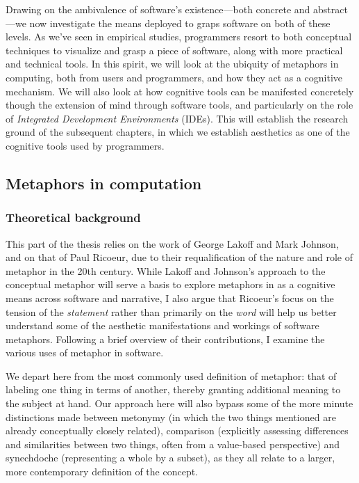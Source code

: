 Drawing on the ambivalence of software's existence—both concrete and abstract—we now investigate the means deployed to graps software on both of these levels. As we've seen in empirical studies, programmers resort to both conceptual techniques to visualize and grasp a piece of software, along with more practical and technical tools. In this spirit, we will look at the ubiquity of metaphors in computing,  both from users and programmers, and how they act as a cognitive mechanism. We will also look at how cognitive tools can be manifested concretely though the extension of mind through software tools, and particularly on the role of \emph{Integrated Development Environments} (IDEs). This will establish the research ground of the subsequent chapters, in which we establish aesthetics as one of the cognitive tools used by programmers.

\vspace{1\baselineskip}

\subsection{Metaphors in computation}

\subsubsection{Theoretical background}

This part of the thesis relies on the work of George Lakoff and Mark Johnson, and on that of Paul Ricoeur, due to their requalification of the nature and role of metaphor in the 20th century. While Lakoff and Johnson's approach to the conceptual metaphor will serve a basis to explore metaphors in as a cognitive means across software and narrative, I also argue that Ricoeur's focus on the tension of the \emph{statement} rather than primarily on the \emph{word} will help us better understand some of the aesthetic manifestations and workings of software metaphors. Following a brief overview of their contributions, I examine the various uses of metaphor in software.


We depart here from the most commonly used definition of metaphor: that of labeling one thing in terms of another, thereby granting additional meaning to the subject at hand. Our approach here will also bypass some of the more minute distinctions made between metonymy (in which the two things mentioned are already conceptually closely related), comparison (explicitly assessing differences and similarities between two things, often from a value-based perspective) and synechdoche (representing a whole by a subset), as they all relate to a larger, more contemporary definition of the concept.

